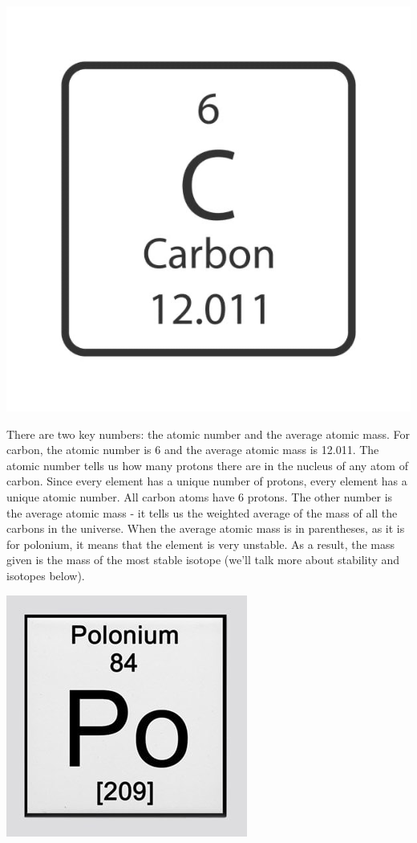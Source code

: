 \begin{center}
\includegraphics[scale=1]{carbon_tile.png}
\end{center}

There are two key numbers: the atomic number and the average atomic mass. For 
carbon, the atomic number is 6 and the average atomic mass is 12.011. The
atomic number tells us how many protons there are in the nucleus of any atom of
carbon. Since every element has a unique number of protons, every element has a 
unique atomic number. All carbon atoms have 6 protons. The other number is the 
average atomic mass - it tells us the weighted average of the mass of all the 
carbons in the universe. When the average atomic mass is in parentheses, as it 
is for polonium, it means that the element is very unstable. As a result, the 
mass given is the mass of the most stable isotope (we'll talk more about 
stability and isotopes below). 

\begin{center}
\includegraphics[scale=1]{polonium_tile.png}
\end{center}

